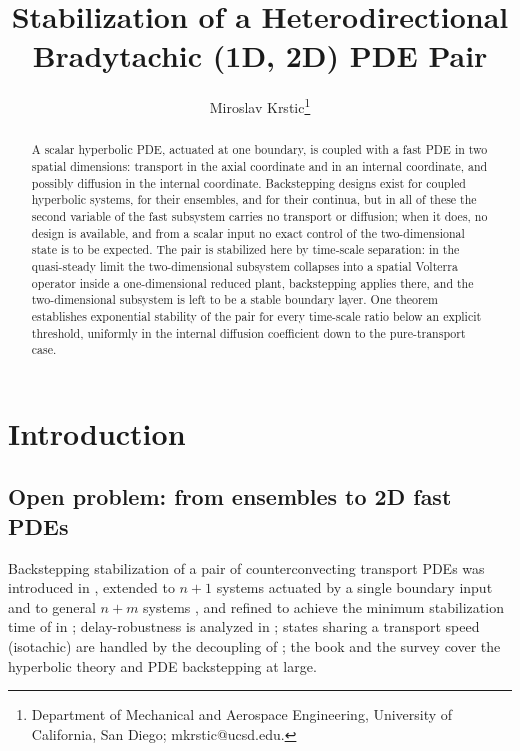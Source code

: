 \documentclass[12pt]{article}
\title{\bfseries Stabilization of a Heterodirectional\\ Bradytachic (1D, 2D) PDE Pair}
\author{Miroslav Krstic\thanks{Department of Mechanical and Aerospace Engineering, University of California, San Diego; mkrstic@ucsd.edu.}}
\date{}
\theoremstyle{plain}
\theoremstyle{remark}
\begin{document}
\maketitle

\begin{abstract}
A scalar hyperbolic PDE, actuated at one boundary, is coupled with a fast PDE in two spatial dimensions: transport in the axial coordinate and in an internal coordinate, and possibly diffusion in the internal coordinate. Backstepping designs exist for coupled hyperbolic systems, for their ensembles, and for their continua, but in all of these the second variable of the fast subsystem carries no transport or diffusion; when it does, no design is available, and from a scalar input no exact control of the two-dimensional state is to be expected. The pair is stabilized here by time-scale separation: in the quasi-steady limit the two-dimensional subsystem collapses into a spatial Volterra operator inside a one-dimensional reduced plant, backstepping applies there, and the two-dimensional subsystem is left to be a stable boundary layer. One theorem establishes exponential stability of the pair for every time-scale ratio below an explicit threshold, uniformly in the internal diffusion coefficient down to the pure-transport case.
\end{abstract}

\section{Introduction}

\subsection{Open problem: from ensembles to 2D fast PDEs}
Backstepping stabilization of a pair of counterconvecting transport PDEs was introduced in \cite{VazquezKrsticCoron2011,CoronVazquezKrsticBastin2013}, extended to $n+1$ systems actuated by a single boundary input \cite{DiMeglioVazquezKrstic2013} and to general $n+m$ systems \cite{HuDiMeglio2016}, and refined to achieve the minimum stabilization time of \cite{LiRao2010} in \cite{AuriolDiMeglio2016,CoronHuOlive2017}; delay-robustness is analyzed in \cite{AuriolAarsnes2018}; states sharing a transport speed (isotachic) are handled by the decoupling of \cite{HuDiMeglio2016}; the book \cite{BastinCoron2016} and the survey \cite{VazquezAuriol2026} cover the hyperbolic theory and PDE backstepping at large.
\end{document}
